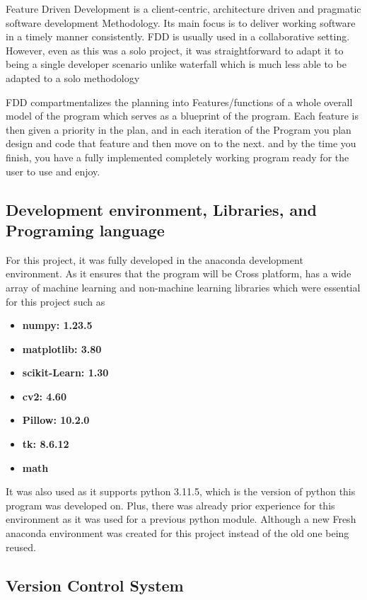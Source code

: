 Feature Driven Development is a client-centric, architecture driven and pragmatic software development Methodology.
Its main focus is to deliver working software in a timely manner consistently.
FDD is usually used in a collaborative setting.
However, even as this was a solo project, it was straightforward to adapt it to being a
 single developer scenario unlike waterfall which is much less able to be adapted to a solo methodology

FDD compartmentalizes the planning into Features/functions of a whole overall model of the program which serves as a blueprint of the program.
Each feature is then given a priority in the plan, and in each iteration of the Program you plan design and code that feature and then move on to the next.
and by the time you finish, you have a fully implemented completely working program ready for the user to use and enjoy.

\subsection{Development environment, Libraries, and Programing language}\label{subsec:development-enviroment-libraries-and-programing-language}

For this project, it was fully developed in the anaconda development environment.
As it ensures that the program will be Cross platform, has a wide array of machine learning and non-machine learning libraries
which were essential for this project such as

\begin{itemize}
    \item \textbf{numpy: 1.23.5}
    \item \textbf{matplotlib: 3.80}
    \item \textbf{scikit-Learn: 1.30}
    \item \textbf{cv2: 4.60}
    \item \textbf{Pillow: 10.2.0}
    \item \textbf{tk: 8.6.12}
    \item \textbf{math}
\end{itemize}

It was also used as it supports python 3.11.5, which is the version of python this program was developed on.
Plus, there was already prior experience for this environment as it was used for a previous python module.
Although a new Fresh anaconda environment was created for this project instead of the old one being reused.

\subsection{Version Control System}\label{subsec:version-control-system}

